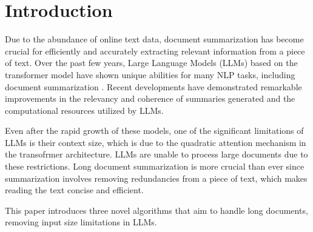 \section{Introduction}
\label{sec:introduction}

Due to the abundance of online text data, document summarization has become crucial
for efficiently and accurately extracting relevant information from a piece of text.
Over the past few years, Large Language Models (LLMs) based on the transformer model
\cite{vaswani2017attention} have shown unique abilities for many NLP tasks, including
document summarization \cite{yadav2023state}.
Recent developments have demonstrated remarkable improvements in the relevancy and
coherence of summaries generated and the computational resources utilized by LLMs.

Even after the rapid growth of these models, one of the significant limitations of
LLMs is their context size, which is due to the quadratic attention mechanism in the
transofrmer architecture.
LLMs are unable to process large documents due to these restrictions.
Long document summarization is more crucial than ever since summarization involves
removing redundancies from a piece of text, which makes reading the text concise and
efficient.

This paper introduces three novel algorithms that aim to handle long documents,
removing input size limitations in LLMs.
